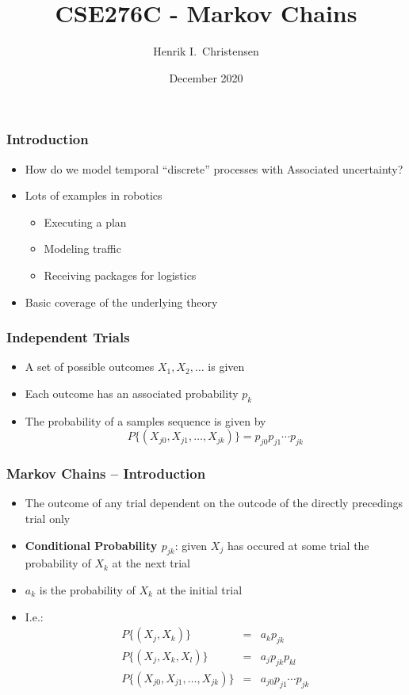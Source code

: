 \documentclass[10pt]{beamer}
\title[Math for Robotics] %
{CSE276C - Markov Chains}
\author[H.~I. Christensen] %
{Henrik I.~Christensen}
\institute[UCSD] %
{
  \begin{minipage}[c]{.2\textwidth}
    \texttt{[image: ucsealnew]}%
  \end{minipage}%
  \begin{minipage}[c]{.6\textwidth}
    \small
      Computer Science and Engineering\\
      University of California, San Diego\\

  \end{minipage}
}
\date[Dec 2020]%
{\small%
  December 2020}
\newcommand{\myemph}[1]{{\usebeamercolor[fg]{emphprimary}
    \textbf{#1}}}
\begin{document}


\begin{frame}[plain]
  \titlepage
\end{frame}


\begin{frame}
  \frametitle{Introduction}
  \begin{itemize}
  \item How do we model temporal ``discrete'' processes with
    Associated uncertainty?
  \item Lots of examples in robotics
    \begin{itemize}
    \item Executing a plan
    \item Modeling traffic
    \item Receiving packages for logistics
    \end{itemize}
  \item Basic coverage of the underlying theory
  \end{itemize}
\end{frame}

\begin{frame}
  \frametitle{Independent Trials}
  \begin{itemize}
  \item A set of possible outcomes $X_1, X_2, \ldots$ is given
  \item Each outcome has an associated probability $p_k$
  \item The probability of a samples sequence is given by
    \[
      P \{ (X_{j0}, X_{j1}, \ldots, X_{jk}) \} = p_{j0} p_{j1} \cdots p_{jk}
    \]
  \end{itemize}
\end{frame}

\begin{frame}
  \frametitle{Markov Chains -- Introduction}
  \begin{itemize}
  \item The outcome of any trial dependent on the outcode of the
    directly precedings trial only
  \item \myemph{Conditional Probability $p_{jk}$}: given $X_j$ has
    occured at some trial the probability of $X_k$ at the next trial
  \item $a_k$ is the probability of $X_k$ at the initial trial
  \item I.e.:
    \[
      \begin{array}{rcl}
        P\{ ( X_j, X_k) \} &=& a_k p_{jk}\\
        P\{ ( X_j, X_k, X_l) \} &=& a_j p_{jk} p_{kl}\\
        P \{ (X_{j0}, X_{j1}, \ldots, X_{jk}) \} &=& a_{j0} p_{j1} \cdots p_{jk}\\
      \end{array}
    \]
  \end{itemize}
\end{frame}
\end{document}
